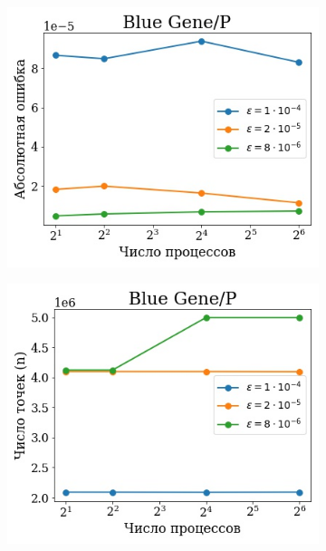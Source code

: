 \documentclass[12pt, fleqn]{article}
\theoremstyle{definition}
\begin{document}
\begin{figure}[ht!]
    \centering
    \begin{subfigure}[t]{0.45\textwidth}
        \centering
        \includegraphics[width=\linewidth]{bluegene_err.jpg} 
        \caption{}\label{fig:bg_err}
    \end{subfigure}
    \hfill
    \begin{subfigure}[t]{0.45\textwidth}
        \centering
        \includegraphics[width=\linewidth]{bluegene_n.jpg} 
        \caption{}\label{fig:bg_n}
    \end{subfigure}

\end{figure}
\end{document}
